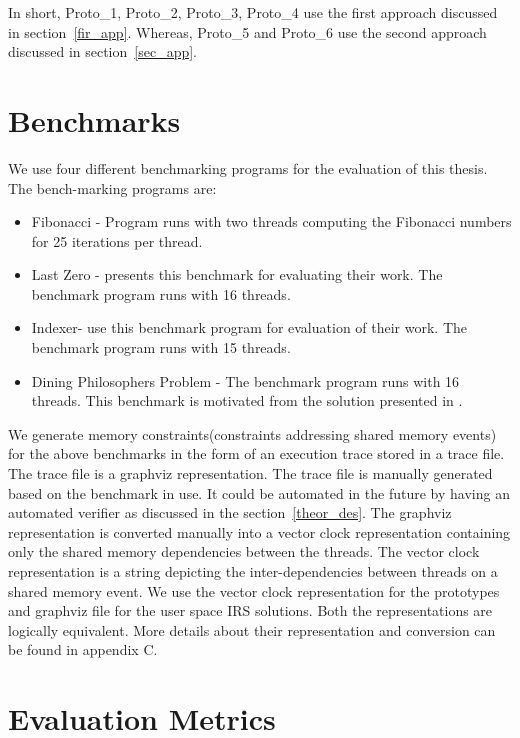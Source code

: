 In short, Proto\_1, Proto\_2, Proto\_3, Proto\_4 use the first approach discussed in section~\ref{fir_app}. 
Whereas, Proto\_5 and Proto\_6 use the second approach discussed in section~\ref{sec_app}.

\section{Benchmarks}

We use four different benchmarking programs for the evaluation of this thesis. 
The bench-marking programs are:
\begin{itemize}
\item{Fibonacci} - Program runs with two threads computing the Fibonacci numbers for 25 iterations per thread.
\item{Last Zero} - \citet{abdulla2014optimal} presents this benchmark for evaluating their work. The benchmark program runs with 16 threads.
\item{Indexer}- \citet{dynamic_por} use this benchmark program for evaluation of their work. The benchmark program runs with 15 threads.
\item{Dining Philosophers Problem} - The benchmark program runs with 16 threads. 
This benchmark is motivated from the solution presented in \citet{silberschatz2014operating}.
\end{itemize}

We generate memory constraints(constraints addressing shared memory events) for the above benchmarks in the form of an execution trace stored in a trace file. 
The trace file is a graphviz representation. 
The trace file is manually generated based on the benchmark in use. 
It could be automated in the future by having an automated verifier as discussed in the section~\ref{theor_des}.
The graphviz representation is converted manually into a vector clock representation containing only the shared memory dependencies between the  threads. 
The vector clock representation is a string depicting the inter-dependencies between threads on a shared memory event. 
We use the vector clock representation for the prototypes and graphviz file for the user space IRS solutions. 
Both the representations are logically equivalent. 
More details about their representation and conversion can be found in appendix C. 

\section{Evaluation Metrics}

